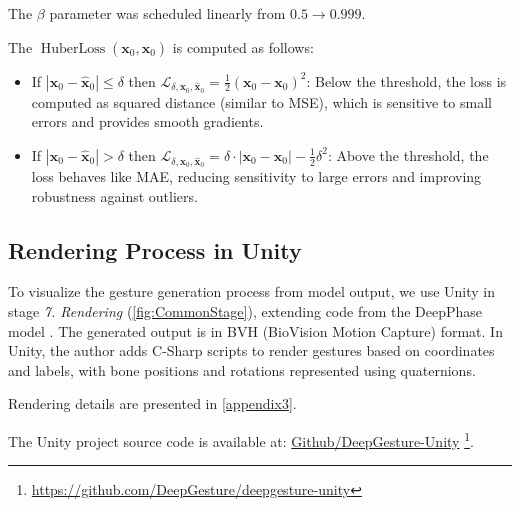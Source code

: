 The $\beta$ parameter was scheduled linearly from $0.5 \rightarrow 0.999$.

The $\operatorname{HuberLoss} (\mathbf{x}_{0},  \hat{\mathbf{x}}_{0} )$ is computed as follows:

\begin{itemize}
	\item If $|\mathbf{x}_0 - \hat{\mathbf{x}}_0| \leq \delta$ then $\mathcal{L}_{ \delta, \mathbf{x}_0, \hat{\mathbf{x}}_0} = \frac{1}{2} (\mathbf{x}_0 - \mathbf{x}_0)^2$: Below the threshold, the loss is computed as squared distance (similar to MSE), which is sensitive to small errors and provides smooth gradients.
	
	\item If $|\mathbf{x}_0 - \hat{\mathbf{x}}_0| > \delta$ then $\mathcal{L}_{ \delta, \mathbf{x}_0, \hat{\mathbf{x}}_0}  =  \delta \cdot |\mathbf{x}_0 - \mathbf{x}_0| - \frac{1}{2} \delta^2$: Above the threshold, the loss behaves like MAE, reducing sensitivity to large errors and improving robustness against outliers.
	
\end{itemize}


\subsection{Rendering Process in Unity}
\label{sec:Render}

To visualize the gesture generation process from model output, we use Unity in stage \textit{7. Rendering} (\autoref{fig:CommonStage}), extending code from the DeepPhase model \cite{starke2022deepphase}. The generated output is in BVH (BioVision Motion Capture) format. In Unity, the author adds C-Sharp scripts to render gestures based on coordinates and labels, with bone positions and rotations represented using quaternions.

Rendering details are presented in \autoref{appendix3}.

The Unity project source code is available at: \hyperlink{https://github.com/DeepGesture/deepgesture-unity}{Github/DeepGesture-Unity}
\footnote{\url{https://github.com/DeepGesture/deepgesture-unity}}.










